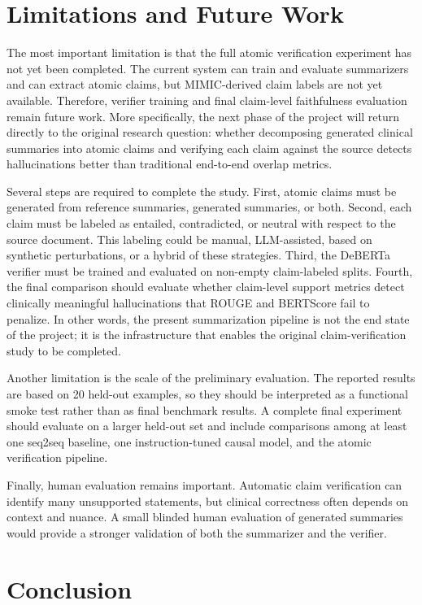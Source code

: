 \documentclass[11pt]{article}
\begin{document}
\section{Limitations and Future Work}

The most important limitation is that the full atomic verification experiment has not yet been completed. The current system can train and evaluate summarizers and can extract atomic claims, but MIMIC-derived claim labels are not yet available. Therefore, verifier training and final claim-level faithfulness evaluation remain future work. More specifically, the next phase of the project will return directly to the original research question: whether decomposing generated clinical summaries into atomic claims and verifying each claim against the source detects hallucinations better than traditional end-to-end overlap metrics.

Several steps are required to complete the study. First, atomic claims must be generated from reference summaries, generated summaries, or both. Second, each claim must be labeled as entailed, contradicted, or neutral with respect to the source document. This labeling could be manual, LLM-assisted, based on synthetic perturbations, or a hybrid of these strategies. Third, the DeBERTa verifier must be trained and evaluated on non-empty claim-labeled splits. Fourth, the final comparison should evaluate whether claim-level support metrics detect clinically meaningful hallucinations that ROUGE and BERTScore fail to penalize. In other words, the present summarization pipeline is not the end state of the project; it is the infrastructure that enables the original claim-verification study to be completed.

Another limitation is the scale of the preliminary evaluation. The reported results are based on 20 held-out examples, so they should be interpreted as a functional smoke test rather than as final benchmark results. A complete final experiment should evaluate on a larger held-out set and include comparisons among at least one seq2seq baseline, one instruction-tuned causal model, and the atomic verification pipeline.

Finally, human evaluation remains important. Automatic claim verification can identify many unsupported statements, but clinical correctness often depends on context and nuance. A small blinded human evaluation of generated summaries would provide a stronger validation of both the summarizer and the verifier.

\section{Conclusion}
\end{document}
